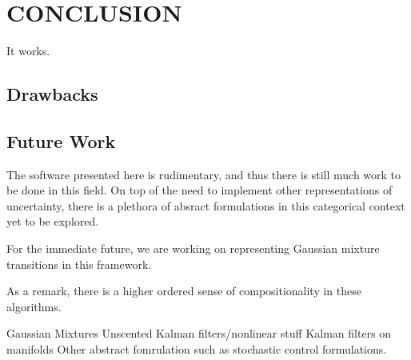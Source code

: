 \documentclass[letterpaper, 10 pt, conference]{ieeeconf}  %
\begin{document}
\section{CONCLUSION}
It works.

\subsection{Drawbacks}
\subsection{Future Work}

The software presented here is rudimentary, and thus there is still much work to be done in this field.
On top of the need to implement other representations of uncertainty, there is a plethora of absract formulations in this categorical context yet to be explored.

For the immediate future, we are working on representing Gaussian mixture transitions in this framework.

As a remark, there is a higher ordered sense of compositionality in these algorithms.

Gaussian Mixtures
Unscented Kalman filters/nonlinear stuff
Kalman filters on manifolds
Other abstract fomrulation such as stochastic control formulations.
\end{document}
